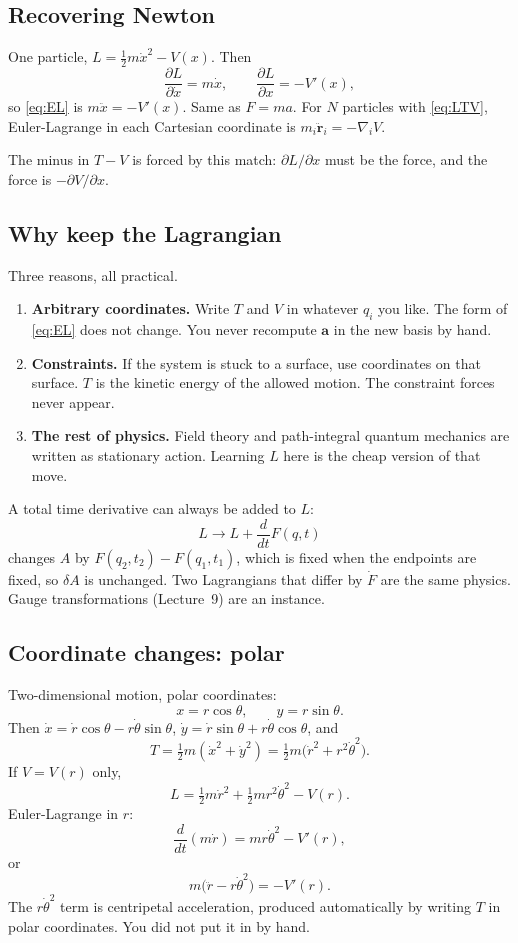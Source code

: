 \documentclass[11pt]{article}
\numberwithin{equation}{section}
\newcommand{\ddt}{\frac{d}{dt}}
\newcommand{\pd}[2]{\frac{\partial #1}{\partial #2}}
\newcommand{\vect}[1]{\mathbf{#1}}
\begin{document}
\subsection{Recovering Newton}

One particle, $L=\tfrac12 m\dot x^2-V(x)$. Then
\[
\pd{L}{\dot x} = m\dot x,\qquad
\pd{L}{x} = -V'(x),
\]
so \eqref{eq:EL} is $m\ddot x=-V'(x)$. Same as $F=ma$. For $N$ particles with \eqref{eq:LTV}, Euler-Lagrange in each Cartesian coordinate is $m_i\ddot{\vect{r}}_i=-\nabla_i V$.

The minus in $T-V$ is forced by this match: $\partial L/\partial x$ must be the force, and the force is $-\partial V/\partial x$.

\subsection{Why keep the Lagrangian}

Three reasons, all practical.
\begin{enumerate}[leftmargin=1.4em]
\item \textbf{Arbitrary coordinates.} Write $T$ and $V$ in whatever $q_i$ you like. The form of \eqref{eq:EL} does not change. You never recompute $\vect{a}$ in the new basis by hand.
\item \textbf{Constraints.} If the system is stuck to a surface, use coordinates on that surface. $T$ is the kinetic energy of the allowed motion. The constraint forces never appear.
\item \textbf{The rest of physics.} Field theory and path-integral quantum mechanics are written as stationary action. Learning $L$ here is the cheap version of that move.
\end{enumerate}

A total time derivative can always be added to $L$:
\[
L \to L + \ddt F(q,t)
\]
changes $A$ by $F(q_2,t_2)-F(q_1,t_1)$, which is fixed when the endpoints are fixed, so $\delta A$ is unchanged. Two Lagrangians that differ by $\dot F$ are the same physics. Gauge transformations (Lecture~9) are an instance.

\subsection{Coordinate changes: polar}

Two-dimensional motion, polar coordinates:
\[
x=r\cos\theta,\qquad y=r\sin\theta.
\]
Then $\dot x=\dot r\cos\theta-r\dot\theta\sin\theta$, $\dot y=\dot r\sin\theta+r\dot\theta\cos\theta$, and
\[
T = \tfrac12 m(\dot x^2+\dot y^2) = \tfrac12 m\bigl(\dot r^2 + r^2\dot\theta^2\bigr).
\]
If $V=V(r)$ only,
\[
L = \tfrac12 m\dot r^2 + \tfrac12 m r^2\dot\theta^2 - V(r).
\]
Euler-Lagrange in $r$:
\[
\ddt(m\dot r) = m r\dot\theta^2 - V'(r),
\]
or
\[
m\bigl(\ddot r - r\dot\theta^2\bigr) = -V'(r).
\]
The $r\dot\theta^2$ term is centripetal acceleration, produced automatically by writing $T$ in polar coordinates. You did not put it in by hand.
\end{document}
